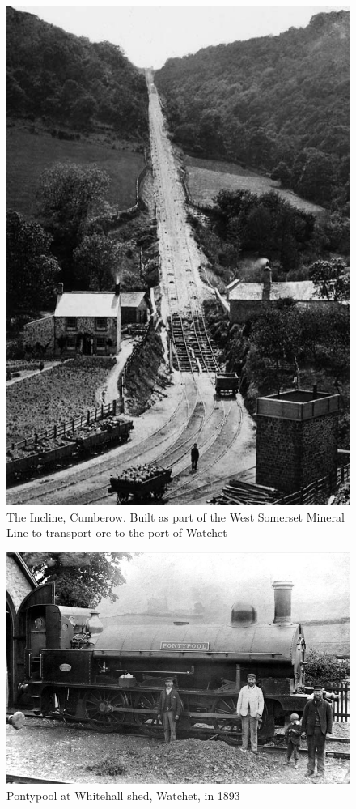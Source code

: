 \begin{figure}
	 \centering
     \includegraphics[width=1\textwidth]{figures/comberowIncline}
     \caption{The Incline, Cumberow. Built as part of the West Somerset Mineral Line to transport ore to the port of Watchet}
     \label{fig:Comberow}
\end{figure}

\begin{figure}
	 \centering
     \includegraphics[width=1\textwidth]{figures/pontypoolWatchet}
     \caption{Pontypool at Whitehall shed, Watchet, in 1893}
     \label{fig:Pontypool}
\end{figure}

